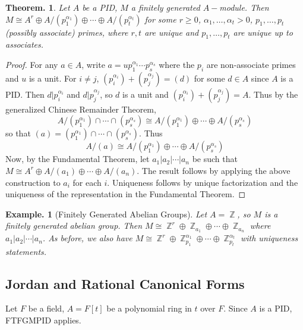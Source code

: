 \documentclass[11pt, a4paper]{memoir}
\DeclareMathOperator{\Z}{{\mathbb{Z}}}
\theoremstyle{change}
\newtheorem{theorem}{Theorem.}[section]
\theoremstyle{plain}
\theoremstyle{nonumberplain}
\newtheorem{example}{Example.}
\newtheorem{proof}{Proof}
\numberwithin{equation}{section}
\begin{document}
\begin{theorem}
    Let $A$ be a PID, $M$ a finitely generated $A-$module.
    Then $M\cong A^r\oplus A/(p_1^{\alpha_1})\oplus\cdots\oplus A/(p_t^{\alpha_t})$ for some $r\geq 0$, $\alpha_1,\ldots,\alpha_t>0$, $p_1,\ldots,p_t$ (possibly associate) primes, where $r,t$ are unique and $p_1,\ldots,p_t$ are unique up to associates.
\end{theorem}
\begin{proof}
    For any $a\in A$, write $a=up_1^{\alpha_1}\cdots p_s^{\alpha_s}$ where the $p_i$ are non-associate primes and $u$ is a unit.
    For $i\neq j$, $(p_i^{\alpha_i})+(p_j^{\alpha_j})=(d)$ for some $d\in A$ since $A$ is a PID.
    Then $d|p_i^{\alpha_i}$ and $d|p_j^{\alpha_j}$, so $d$ is a unit and $(p_i^{\alpha_i})+(p_j^{\alpha_j})=A$.
    Thus by the generalized Chinese Remainder Theorem,
    \begin{equation*}
        A/(p_1^{\alpha_1})\cap\cdots\cap(p_s^{\alpha_s})\cong A/(p_1^{\alpha_1})\oplus \cdots\oplus A/(p_s^{\alpha_s})
    \end{equation*}
    so that $(a)=(p_1^{\alpha_1})\cap\cdots\cap(p_s^{\alpha_s})$.
    Thus
    \begin{equation*}
        A/(a)\cong A/(p_1^{\alpha_1})\oplus \cdots\oplus A/(p_s^{\alpha_s})
    \end{equation*}
    Now, by the Fundamental Theorem, let $a_1|a_2|\cdots|a_n$ be such that $M\cong A^r\oplus A/(a_1)\oplus\cdots\oplus A/(a_n)$.
    The result follows by applying the above construction to $a_i$ for each $i$.
    Uniqueness follows by unique factorization and the uniqueness of the representation in the Fundamental Theorem.
\end{proof}
\begin{example}[Finitely Generated Abelian Groups]
    Let $A=\Z$, so $M$ is a finitely generated abelian group.
    Then $M\cong\Z^r\oplus \Z_{a_1}\oplus\cdots\oplus\Z_{a_n}$ where $a_1|a_2|\cdots|a_n$.
    As before, we also have $M\cong\Z^r\oplus\Z_{p_1}^{\alpha_1}\oplus\cdots\oplus\Z_{p_t}^{\alpha_t}$ with uniqueness statements.
\end{example}
\subsection{Jordan and Rational Canonical Forms}
Let $F$ be a field, $A=F[t]$ be a polynomial ring in $t$ over $F$.
Since $A$ is a PID, FTFGMPID applies.
\end{document}
